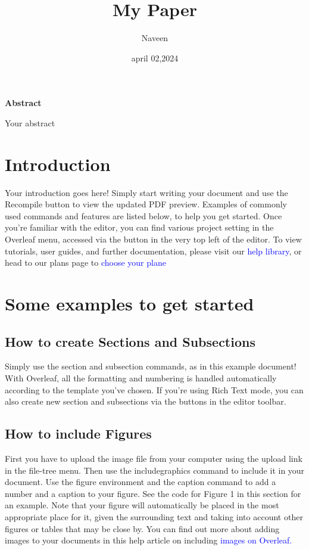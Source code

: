 \documentclass{article}
\title{My Paper}
\author{Naveen}
\date{april 02,2024}
\begin{document}
	\maketitle
	\begin{center}
		\textbf{Abstract}
	\end{center}
	Your abstract
	\section{Introduction}
	Your introduction goes here! Simply start writing your document and use the Recompile button to
	view the updated PDF preview. Examples of commonly used commands and features are listed below,
	to help you get started.
	Once you’re familiar with the editor, you can find various project setting in the Overleaf menu,
	accessed via the button in the very top left of the editor. To view tutorials, user guides, and further
	documentation, please visit our \textcolor{blue}{help library}, or head to our plans page to \textcolor{blue}{choose your plane}
	\section{Some examples to get started}
	\subsection{How to create Sections and Subsections}
	Simply use the section and subsection commands, as in this example document! With Overleaf, all
	the formatting and numbering is handled automatically according to the template you’ve chosen. If
	you’re using Rich Text mode, you can also create new section and subsections via the buttons in the
	editor toolbar.
	\subsection{How to include Figures}
	First you have to upload the image file from your computer using the upload link in the file-tree menu.
	Then use the includegraphics command to include it in your document. Use the figure environment
	and the caption command to add a number and a caption to your figure. See the code for Figure 1 in
	this section for an example.
	Note that your figure will automatically be placed in the most appropriate place for it, given the
	surrounding text and taking into account other figures or tables that may be close by. You can find
	out more about adding images to your documents in this help article on including \textcolor{blue}{images on Overleaf.}
	
\end{document}
